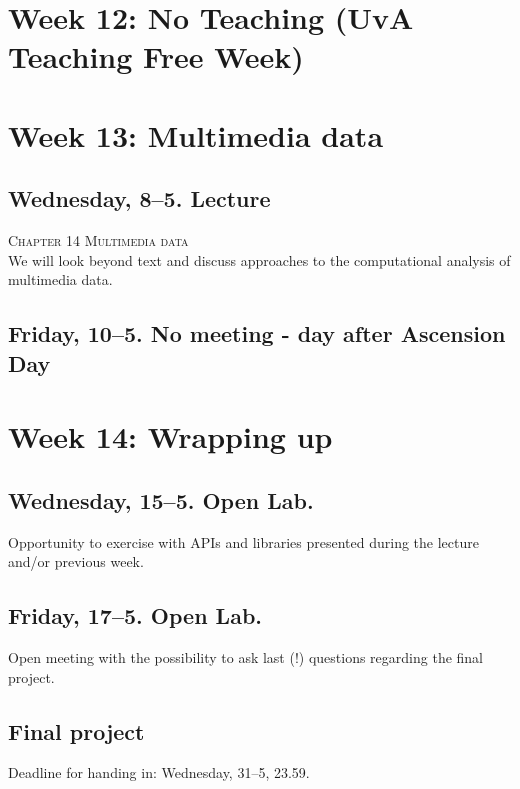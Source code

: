 \section*{Week 12: No Teaching (UvA Teaching Free Week)}







\section*{Week 13: Multimedia data}

\subsection*{Wednesday, 8--5. Lecture}
\textsc{ Chapter 14 Multimedia data}\\
We will look beyond text and discuss approaches to the computational analysis of multimedia data.


\subsection*{Friday, 10--5. No meeting - day after Ascension Day}


\section*{Week 14: Wrapping up}

\subsection*{Wednesday, 15--5. Open Lab.}
Opportunity to exercise with APIs and libraries presented during the lecture and/or previous week.


\subsection*{Friday, 17--5. Open Lab.}
Open meeting with the possibility to ask last (!) questions regarding the final project.




\subsection*{Final project}
Deadline for handing in: Wednesday, 31--5, 23.59.
